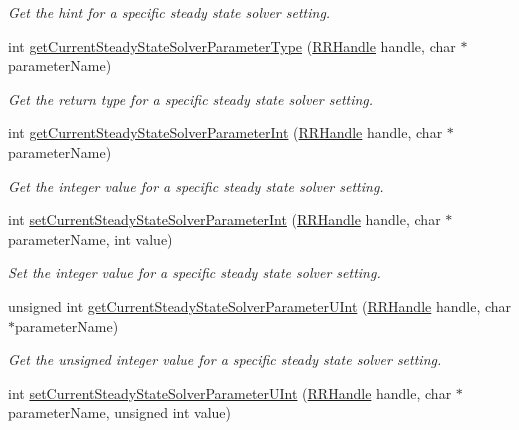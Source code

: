 \begin{DoxyCompactItemize}
\begin{DoxyCompactList}\small\item\em Get the hint for a specific steady state solver setting. \end{DoxyCompactList}\item 
int \hyperlink{group__simopts_ga56bede07a54dfef6e610f231a794b8bf}{get\+Current\+Steady\+State\+Solver\+Parameter\+Type} (\hyperlink{rrc__types_8h_a1d68f0592372208fa5a5f2799ea4b3ae}{R\+R\+Handle} handle, char $\ast$parameter\+Name)
\begin{DoxyCompactList}\small\item\em Get the return type for a specific steady state solver setting. \end{DoxyCompactList}\item 
int \hyperlink{group__simopts_gaa9d75e9d517748ca24a31bdc7aabd403}{get\+Current\+Steady\+State\+Solver\+Parameter\+Int} (\hyperlink{rrc__types_8h_a1d68f0592372208fa5a5f2799ea4b3ae}{R\+R\+Handle} handle, char $\ast$parameter\+Name)
\begin{DoxyCompactList}\small\item\em Get the integer value for a specific steady state solver setting. \end{DoxyCompactList}\item 
int \hyperlink{group__simopts_gabfe7778b94e2c0311cb58ed61fa84697}{set\+Current\+Steady\+State\+Solver\+Parameter\+Int} (\hyperlink{rrc__types_8h_a1d68f0592372208fa5a5f2799ea4b3ae}{R\+R\+Handle} handle, char $\ast$parameter\+Name, int value)
\begin{DoxyCompactList}\small\item\em Set the integer value for a specific steady state solver setting. \end{DoxyCompactList}\item 
unsigned int \hyperlink{group__simopts_gad591e2afd57f3c63cd9df72949daefb1}{get\+Current\+Steady\+State\+Solver\+Parameter\+U\+Int} (\hyperlink{rrc__types_8h_a1d68f0592372208fa5a5f2799ea4b3ae}{R\+R\+Handle} handle, char $\ast$parameter\+Name)
\begin{DoxyCompactList}\small\item\em Get the unsigned integer value for a specific steady state solver setting. \end{DoxyCompactList}\item 
int \hyperlink{group__simopts_ga3091b392515179d6993e9255f327cb3e}{set\+Current\+Steady\+State\+Solver\+Parameter\+U\+Int} (\hyperlink{rrc__types_8h_a1d68f0592372208fa5a5f2799ea4b3ae}{R\+R\+Handle} handle, char $\ast$parameter\+Name, unsigned int value)

\end{DoxyCompactItemize}
